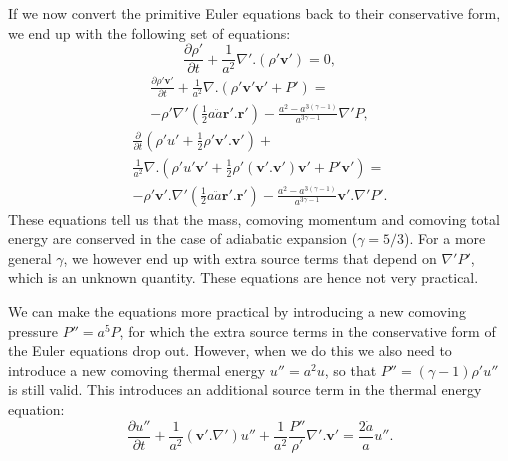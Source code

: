 If we now convert the primitive Euler equations back to their conservative form,
we end up with the following set of equations:
\begin{equation}
\frac{\partial{} \rho{}'}{\partial{} t} + \frac{1}{a^2} \nabla{}' . \left(
\rho{}' \mathbf{v}' \right) = 0,
\end{equation}
\begin{multline}
\frac{\partial{} \rho{}' \mathbf{v}'}{\partial{} t} + \frac{1}{a^2}
\nabla{} . \left( \rho{}' \mathbf{v}'\mathbf{v}' + P' \right) = \\
- \rho{}' \nabla{}' \left( \frac{1}{2} a \ddot{a} \mathbf{r}'.\mathbf{r}'
\right) - \frac{a^2 - a^{3(\gamma{}-1)}}{a^{3\gamma{} - 1}} \nabla{}'P,
\end{multline}
\begin{multline}
\frac{\partial{}}{\partial{} t} \left( \rho{}' u' + \frac{1}{2} \rho{}'
\mathbf{v}'.\mathbf{v}' \right) +\\
\frac{1}{a^2}\nabla{} . \left( \rho{}' u' \mathbf{v}' +
\frac{1}{2} \rho{}' \left(\mathbf{v}'. \mathbf{v}'\right)
\mathbf{v}' + P' \mathbf{v}' \right) =\\
- \rho{}' \mathbf{v}'.\nabla{}' \left( \frac{1}{2} a \ddot{a} \mathbf{r}'.
\mathbf{r}' \right) - \frac{a^2 - a^{3(\gamma{}-1)}}{a^{3\gamma{} - 1}}
\mathbf{v}'.\nabla{}'P'.
\end{multline}
These equations tell us that the mass, comoving momentum and comoving total
energy are conserved in the case of adiabatic expansion ($\gamma{} = 5/3$).
For a more general $\gamma{}$, we however end up with extra source terms that
depend on $\nabla{}'P'$, which is an unknown quantity. These equations are
hence not very practical.

We can make the equations more practical by introducing a new comoving pressure
$P'' = a^5 P$, for which the extra source terms in the conservative form of
the Euler equations drop out. However, when we do this we also need to introduce
a new comoving thermal energy $u'' = a^2 u$, so that
$P'' = (\gamma{}-1)\rho'u''$ is still valid. This introduces an additional
source term in the thermal energy equation:
\begin{equation}
\frac{\partial{} u''}{\partial{} t} + \frac{1}{a^2} \left( \mathbf{v}' .
\nabla{}' \right) u'' +
\frac{1}{a^2} \frac{P''}{\rho{}'} \nabla{}' . \mathbf{v}'
= \frac{2\dot{a}}{a} u''.
\end{equation}
